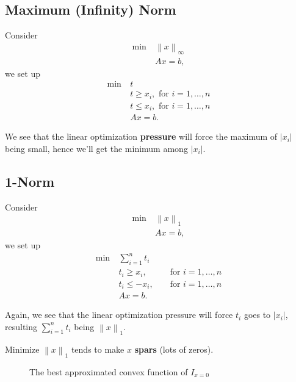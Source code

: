 \subsection{Maximum (Infinity) Norm}
Consider
\[
	\begin{aligned}
		\min~ & \left\lVert x\right\rVert_{\infty } \\
		      & Ax = b,
	\end{aligned}
\]
we set up
\[
	\begin{aligned}
		\min~ & t                                      \\
		      & t\geq x_i,\text{ for }i = 1, \ldots ,n \\
		      & t\leq x_i,\text{ for }i = 1, \ldots ,n \\
		      & Ax = b.
	\end{aligned}
\]

We see that the linear optimization \textbf{pressure} will force the maximum of \(\left\vert x_i \right\vert \) being small, hence
we'll get the minimum among \(\left\vert x_i \right\vert \).

\subsection{1-Norm}
Consider
\[
	\begin{aligned}
		\min~ & \left\lVert x\right\rVert_1 \\
		      & Ax = b,
	\end{aligned}
\]
we set up
\[
	\begin{alignedat}{3}
		\min~ & \sum\limits_{i=1}^{n} t_i                \\
		& t_i\geq x_i, && \text{ for }i = 1, \ldots ,n  \\
		& t_i\leq -x_i, && \text{ for }i = 1, \ldots ,n \\
		& Ax = b.
	\end{alignedat}
\]

Again, we see that the linear optimization pressure will force \(t_i\) goes to \(\left\vert x_i \right\vert \), resulting
\(\sum\limits_{i=1}^{n} t_i\) being \(\left\lVert x\right\rVert_1\).

\begin{remark}
	Minimize \(\left\lVert x\right\rVert_1\) tends to make \(x\) \textbf{spars} (lots of zeros).
	\begin{figure}[H]
		\centering
		\caption{The best approximated convex function of \(I_{x = 0}\) }
		\label{fig:1-norm}
	\end{figure}
\end{remark}
